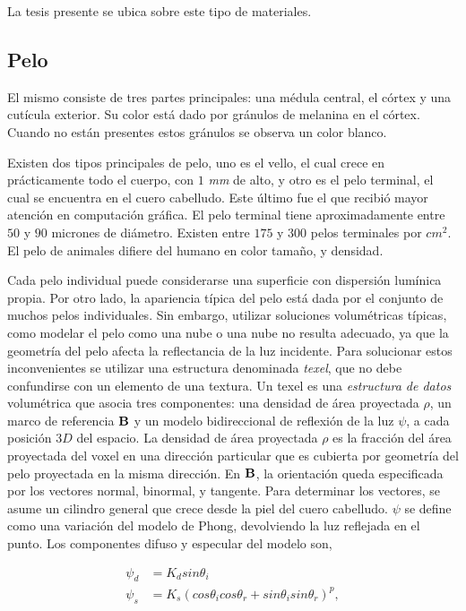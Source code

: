 La tesis presente se ubica sobre este tipo de materiales.

\subsection{Pelo}
El mismo consiste de tres partes principales: una médula central, el córtex y una cutícula exterior.
Su color está dado por gránulos de melanina en el córtex.
Cuando no están presentes estos gránulos se observa un color blanco.


Existen dos tipos principales de pelo, uno es el vello, el cual crece en prácticamente todo el cuerpo, con $1$ {\em mm} de alto, y otro es el pelo terminal, el cual se encuentra en el cuero cabelludo.
Este último fue el que recibió mayor atención en computación gráfica.
El pelo terminal tiene aproximadamente entre $50$ y $90$ micrones de diámetro.
Existen entre $175$ y $300$ pelos terminales por {\em $cm^{2}$}.
El pelo de animales difiere del humano en color tamaño, y densidad.

Cada pelo individual puede considerarse una superficie con dispersión lumínica propia.
Por otro lado, la apariencia típica del pelo está dada por el conjunto de muchos pelos individuales.
Sin embargo, utilizar soluciones volumétricas típicas, como modelar el pelo como una nube o una nube no resulta adecuado, ya que la geometría del pelo afecta la reflectancia de la luz incidente.
Para solucionar estos inconvenientes se utilizar una estructura denominada {\em texel}, que no debe confundirse con un elemento de una textura.
Un texel es una {\em estructura de datos} volumétrica que asocia tres componentes: una densidad de área proyectada $\rho$, un marco de referencia $\bold{B}$ y un modelo bidireccional de reflexión de la luz $\psi$, a cada posición $3D$ del espacio.
La densidad de área proyectada $\rho$ es la fracción del área proyectada del voxel en una dirección particular que es cubierta por geometría del pelo proyectada en la misma dirección.
En $\bold{B}$, la orientación queda especificada por los vectores normal, binormal, y tangente.
Para determinar los vectores, se asume un cilindro general que crece desde la piel del cuero cabelludo.
$\psi$ se define como una variación del modelo de Phong, devolviendo la luz reflejada en el punto.
Los componentes difuso y especular del modelo son,

\begin{align*}
\psi_{d} &= K_{d} sin \theta_{i}\\
\psi_{s} &= K_{s} (cos \theta_{i} cos \theta_{r} + sin \theta_{i} sin \theta_{r})^{p},
\end{align*}

